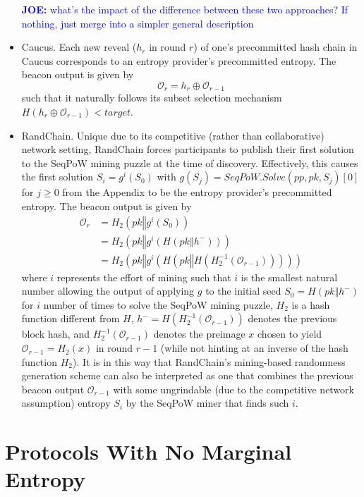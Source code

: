 \documentclass[letterpaper,twocolumn,10pt]{article}
\theoremstyle{definition}
\theoremstyle{remark}
\newcommand{\joenote}[1]{\textcolor{blue}{\textbf{JOE:} #1}}
\begin{document}
\begin{itemize}
\joenote{what's the impact of the difference between these two approaches? If nothing, just merge into a simpler general description}
\item Caucus. Each new reveal ($h_r$ in round $r$) of one's precommitted hash chain in Caucus corresponds to an entropy provider's precommitted entropy. The beacon output is given by
\[
\mathcal{O}_r = h_r \oplus \mathcal{O}_{r - 1}
\]
such that it naturally follows its subset selection mechanism $H(h_r \oplus \mathcal{O}_{r - 1}) < target$.
\item RandChain. Unique due to its competitive (rather than collaborative) network setting, RandChain forces participants to publish their first solution to the SeqPoW mining puzzle at the time of discovery. Effectively, this causes the first solution $S_i = g^i(S_0)$ with $g(S_j) = SeqPoW.Solve(pp, pk, S_j)[0]$ for $j \geq 0$ from the Appendix to be the entropy provider's precommitted entropy. The beacon output is given by
\begin{align*}
\mathcal{O}_r &= H_2(pk \mathbin\Vert g^i(S_0))\\
&= H_2(pk \mathbin\Vert g^i(H(pk \mathbin\Vert h^-)))\\
&= H_2(pk \mathbin\Vert g^i(H(pk \mathbin\Vert H(H_2^{-1}(\mathcal{O}_{r - 1})))))
\end{align*}
where $i$ represents the effort of mining such that $i$ is the smallest natural number allowing the output of applying $g$ to the initial seed $S_0 = H(pk \mathbin\Vert h^-)$ for $i$ number of times to solve the SeqPoW mining puzzle, $H_2$ is a hash function different from $H$, $h^- = H(H_2^{-1}(\mathcal{O}_{r - 1}))$ denotes the previous block hash, and $H_2^{-1}(\mathcal{O}_{r - 1})$ denotes the preimage $x$ chosen to yield $\mathcal{O}_{r - 1} = H_2(x)$ in round $r - 1$ (while not hinting at an inverse of the hash function $H_2$). It is in this way that RandChain's mining-based randomness generation scheme can also be interpreted as one that combines the previous beacon output $\mathcal{O}_{r - 1}$ with some ungrindable (due to the competitive network assumption) entropy $S_i$ by the SeqPoW miner that finds such $i$.
\end{itemize}

\section{Protocols With No Marginal Entropy}
\label{section:dvrf}
\end{document}
